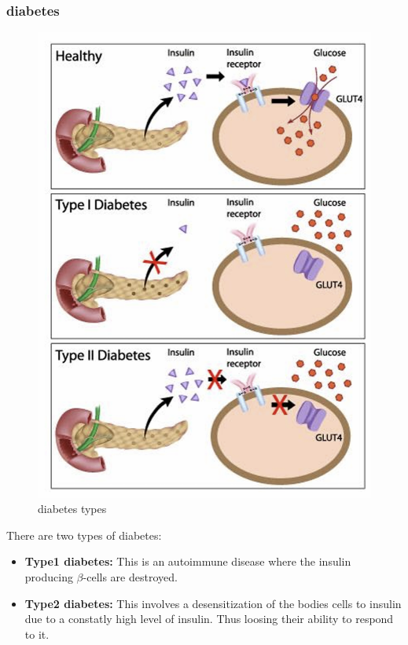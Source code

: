\documentclass[../main.tex]{subfiles}
\begin{document}
\subsubsection{diabetes}
\begin{figure}[H]
    \centering
    \includegraphics[width=0.5\linewidth]{Sum_BC_II//lectures//bcll12/diabetes.png}
    \caption{diabetes types}
    \label{fig:enter-label}
\end{figure}
There are two types of diabetes:
\begin{itemize}
    \item \textbf{Type1 diabetes:} This is an autoimmune disease where the insulin producing $\beta$-cells are destroyed. 
    \item \textbf{Type2 diabetes:} This involves a desensitization of the bodies cells to insulin due to a constatly high level of insulin. Thus loosing their ability to respond to it.
\end{itemize}
\end{document}
